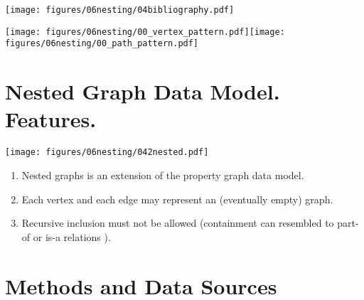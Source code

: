 \documentclass[a0,portrait]{a0poster}
\begin{document}
\begin{multicols}{2}
\begin{center}\vspace{1cm}
	\texttt{[image: figures/06nesting/04bibliography.pdf]}
\end{center}\vspace{1cm}

\begin{center}\vspace{1cm}
	\texttt{[image: figures/06nesting/00\_vertex\_pattern.pdf]}\texttt{[image: figures/06nesting/00\_path\_pattern.pdf]}
\end{center}\vspace{1cm}

\section*{Nested Graph Data Model. Features.}

\begin{center}\vspace{1cm}
	\texttt{[image: figures/06nesting/042nested.pdf]}
\end{center}\vspace{1cm}

\begin{enumerate}
\item Nested graphs is an extension of the property graph data model.
\item Each vertex and each edge may represent an (eventually empty) graph.
\item Recursive inclusion must not be allowed (containment can resembled to part-of or is-a relations \cite{Tesi}).
\end{enumerate}


\section*{Methods and Data Sources}


\end{multicols}
\end{document}
